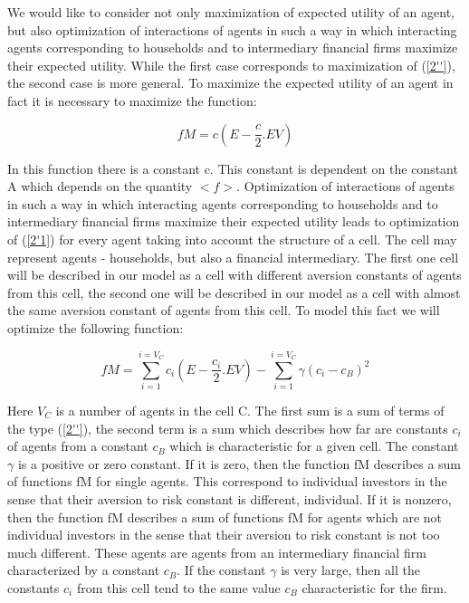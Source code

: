 \documentclass[10pt]{article}
\begin{document}
We would like to consider not only maximization of expected utility of an agent, but also optimization of interactions of agents in such a way in which interacting agents corresponding to households and to intermediary financial firms maximize their expected utility.
While the first case corresponds to maximization of (\ref{2''}), the second case is more general.
To maximize the expected utility of an agent in fact it is necessary to maximize the function:

\begin{equation}
\label{2'1}
fM = c(E-\frac{c}{2}.EV)
\end{equation}

In this function there is a constant c. This constant is dependent on the constant A which depends on the quantity $<f>$. Optimization of interactions of agents in such a way in which interacting agents corresponding to households and to intermediary financial firms maximize their expected utility leads to optimization  of (\ref{2'1}) for every agent taking into account the structure of a cell. The cell may represent agents - households, but also a financial intermediary.
The first one cell will be described in our model as a cell with different aversion constants of agents from this cell, the second one will be described in our model as a cell with almost the same aversion constant of agents from this cell.
To model this fact we will optimize the following function:

\begin{equation}
\label{2'11}
fM = \sum_{i=1}^{i=V_{C}} c_{i}(E-\frac{c_{i}}{2}.EV) - \sum_{i=1}^{i=V_{C}} \gamma (c_{i}-c_{B})^{2}
\end{equation}

Here $V_{C}$ is a number of agents in the cell C.
The first sum is a sum of terms of the type (\ref{2''}), the second term is a sum which describes how far are constants $c_{i}$ of agents from a constant $ c_{B} $ which is characteristic for a given cell. The constant $\gamma$ is a positive or zero constant. If it is zero, then the function fM describes a sum of functions fM for single agents. This correspond to individual investors in the sense that their aversion to risk constant is different, individual. If it is nonzero, then the function fM describes a sum of functions fM for agents which are not individual investors in the sense that their aversion to risk constant is not too much different. These agents are agents from an intermediary financial firm characterized by a constant $ c_{B} $. If the constant $\gamma$ is very large, then all the constants $c_{i}$ from this cell tend to the same value $ c_{B} $ characteristic for the firm.
\end{document}
